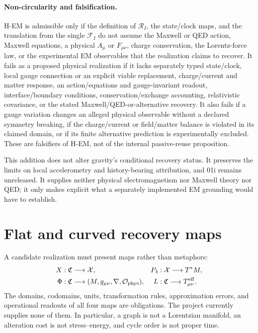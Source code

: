 \documentclass[11pt,a4paper]{article}
\theoremstyle{remark}
\newcommand{\Cont}{\mathfrak C}
\newcommand{\State}{\mathcal X}
\newcommand{\Obs}{\mathcal O}
\begin{document}
\paragraph{Non-circularity and falsification.}
H-EM is admissible only if the definition of $\mathcal R_I$, the state/clock
maps, and the translation from the single $\mathcal F_I$ do not assume the
Maxwell or QED action, Maxwell equations, a physical $A_\mu$ or $F_{\mu\nu}$,
charge conservation, the Lorentz-force law, or the experimental EM observables
that the realization claims to recover. It fails as a proposed physical
realization if it lacks separately typed state/clock, local gauge connection or
an explicit viable replacement, charge/current and matter response, an
action/equations and gauge-invariant readout, interface/boundary conditions,
conservation/exchange accounting, relativistic covariance, or the stated
Maxwell/QED-or-alternative recovery. It also fails if a gauge variation changes
an alleged physical observable without a declared symmetry breaking, if the
charge/current or field/matter balance is violated in its claimed domain, or if
its finite alternative prediction is experimentally excluded. These are
falsifiers of H-EM, not of the internal passive-reuse proposition.

This addition does not alter gravity's conditional recovery status. It preserves
the limits on local accelerometry and history-bearing attribution, and 01i
remains unreleased. It supplies neither physical electromagnetism nor Maxwell
theory nor QED; it only makes explicit what a separately implemented EM
grounding would have to establish.

\section{Flat and curved recovery maps}\label{sec:maps}
A candidate realization must present maps rather than metaphors:
\[
\begin{aligned}
 X&:\Cont\longrightarrow\State, &
 P_4&:\State\longrightarrow T^*M,\\
 \Phi&:\Cont\longrightarrow(M,g_{\mu\nu},\nabla,\Obs_{\rm phys}), &
 L&:\Cont\longrightarrow T^{\rm eff}_{\mu\nu}.
\end{aligned}
\]
The domains, codomains, units, transformation rules, approximation errors, and
operational readouts of all four maps are obligations. The project currently
supplies none of them. In particular, a graph is not a Lorentzian manifold, an
alteration cost is not stress--energy, and cycle order is not proper time.
\end{document}
